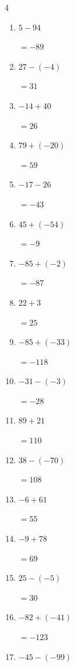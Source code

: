 \begin{multicols}{4}
\begin{enumerate}
        $=-131$

  \item $5-94$

        $=-89$

  \item $27-(-4)$

        $=31$

  \item $-14+40$

        $=26$

  \item $79+(-20)$

        $=59$

  \item $-17-26$

        $=-43$

  \item $45+(-54)$

        $=-9$

  \item $-85+(-2)$

        $=-87$

  \item $22+3$

        $=25$

  \item $-85+(-33)$

        $=-118$

  \item $-31-(-3)$

        $=-28$

  \item $89+21$

        $=110$

  \item $38-(-70)$

        $=108$

  \item $-6+61$

        $=55$

  \item $-9+78$

        $=69$

\columnbreak %

  \item $25-(-5)$

        $=30$

  \item $-82+(-41)$

        $=-123$

  \item $-45-(-99)$


\end{enumerate}
\end{multicols}
